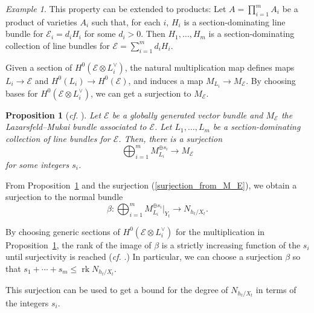 \documentclass[10pt,a4paper]{article}
\numberwithin{equation}{section}
\newtheorem{proposition}[theorem]{Proposition}
\theoremstyle{definition}
\theoremstyle{remark}
\newtheorem{example}[theorem]{Example}
\DeclareMathOperator{\rk}{rk}
\newcommand{\lra}{\longrightarrow}
\begin{document}
\begin{example}\label{section-dom-products}
This property can be extended to products: Let $A = \prod_{i=1}^m A_i$ be a product of varieties $A_i$ such that, for each $i$, $H_i$ is a section-dominating line bundle for $\mathcal{E}_i=d_iH_i$ for some $d_i>0$. Then $H_1, \hdots , H_m$ is a section-dominating collection of line bundles for $\mathcal{E} = \sum_{i=1}^m d_iH_i$. 
\end{example}

Given a section of $H^0(\mathcal{E}\otimes L_i^\vee)$, the natural multiplication map defines maps $L_i\to \mathcal{E}$ and $H^0(L_i)\to H^0(\mathcal{E})$, and induces a map $M_{L_i}\to M_{\mathcal{E}}$. By choosing bases for $H^0(\mathcal{E}\otimes L_i^\vee)$, we can get a surjection to $M_{\mathcal{E}}$.

\begin{proposition}[\textit{cf.} {\cite[Proposition 2.7]{CR19}}]\label{surjectionofmukai}
Let $\mathcal{E}$ be a globally generated vector bundle and $M_{\mathcal{E}}$ the Lazarsfeld--Mukai bundle associated to $\mathcal{E}$. Let $L_1, \hdots , L_m$ be a section-dominating collection of line bundles for $\mathcal{E}$. Then, there is a surjection
\[ \bigoplus _{i=1}^{m}M_{L_i}^{\oplus s_i}\lra M_{\mathcal{E}} \]
for some integers $s_i$.
\end{proposition}

From Proposition~\ref{surjectionofmukai} and the surjection (\ref{surjection_from_M_E}), we obtain a surjection to the normal bundle
\begin{equation}\label{surjection_beta}
\beta\colon \bigoplus _{i=1}^{m}M_{L_i}^{\oplus s_i}|_{Y_t}\lra N_{h_t/X_t}.
\end{equation}

By choosing generic sections of $H^0(\mathcal{E}\otimes L_i^\vee)$ for the multiplication in Proposition~\ref{surjectionofmukai}, the rank of the image of $\beta$ is a strictly increasing function of the $s_i$ until surjectivity is reached (\textit{cf.} \cite[Section 2.2]{Cl03}.) In particular, we can choose a surjection $\beta$ so that $s_1 + \cdots + s_m\le \rk N_{h_t/X_t}$.

This surjection can be used to get a bound for the degree of $N_{h_t/X_t}$ in terms of the integers $s_i$.
\end{document}
